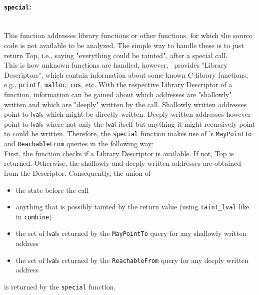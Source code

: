           \paragraph{\texttt{special}:}\mbox{}\\
          This function addresses library functions or other functions, for which the source code is not available to be analyzed. The simple way to handle these is to just return Top, i.e., saying "everything could be tainted", after a special call.\\
          This is how unknown functions are handled, however, \gob\ provides "Library Descriptors", which contain information about some known C library functions, e.g., \texttt{printf}, \texttt{malloc}, \texttt{cos}, etc. With the respective Library Descriptor of a function, information can be gained about which addresses are "shallowly" written and which are "deeply" written by the call. Shallowly written addresses point to $\textsf{lval}$s which might be directly written. Deeply written addresses however point to $\textsf{lval}$s where not only the $\textsf{lval}$ itself but anything it might recursively point to could be written. Therefore, the \texttt{special} function makes use of \gob's \texttt{MayPointTo} and \texttt{ReachableFrom} queries in the following way:\\
          First, the function checks if a Library Descriptor is available. If not, Top is returned. Otherwise, the shallowly and deeply written addresses are obtained from the Descriptor. Consequently, the union of 
          \begin{itemize}
            \item the state before the call
            \item anything that is possibly tainted by the return value (using \texttt{taint\_lval} like in \texttt{combine}) 
            \item the set of $\textsf{lval}$s returned by the \texttt{MayPointTo} query for any shallowly written address
            \item the set of $\textsf{lval}$s returned by the \texttt{ReachableFrom} query for any deeply written address
          \end{itemize}
          is returned by the \texttt{special} function.

